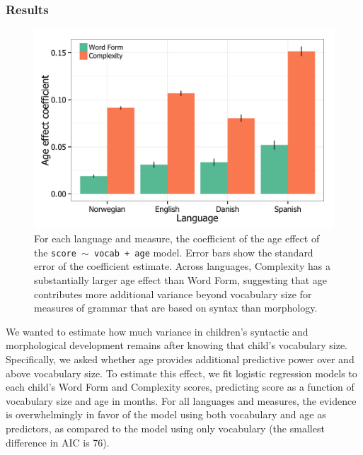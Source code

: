\documentclass[10pt,letterpaper]{article}
\begin{document}
\subsubsection{Results}

\begin{figure}
\begin{center}
\includegraphics[width=\linewidth]{plots/coefs_wordform_complexity.png}
\end{center}
\caption{\label{fig:coefs_grammar} For each language and measure, the coefficient of the age effect of the \small{\tt{score $\sim$ vocab + age}} model. Error bars show the standard error of the coefficient estimate. Across languages, Complexity has a substantially larger age effect than Word Form, suggesting that age contributes more additional variance beyond vocabulary size for measures of grammar that are based on syntax than morphology.} 
\end{figure}

We wanted to estimate how much variance in children's syntactic and morphological development remains after knowing that child's vocabulary size. Specifically, we asked whether age provides additional predictive power over and above vocabulary size. To estimate this effect, we fit logistic regression models to each child's Word Form and Complexity scores, predicting score as a function of vocabulary size and age in months. For all languages and measures, the evidence is overwhelmingly in favor of the model using both vocabulary and age as predictors, as compared to the model using only vocabulary (the smallest difference in AIC is 76). %
\end{document}
